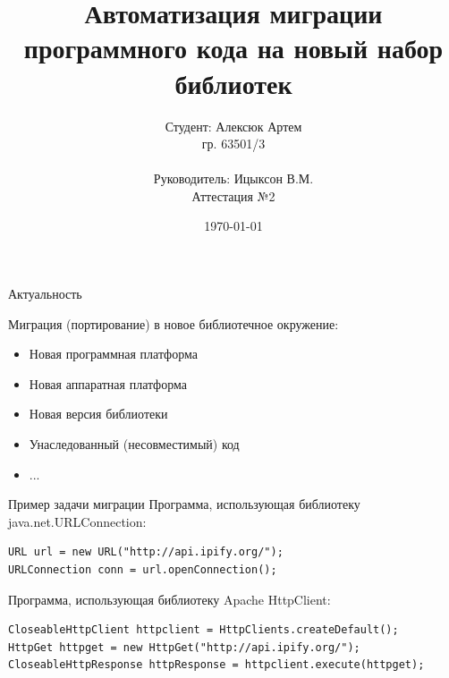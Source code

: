 \documentclass[12pt]{beamer}
\title{Автоматизация миграции программного кода на новый набор библиотек}
\date{\today}
\author[Алексюк Артем]{
    Студент: Алексюк Артем\\
    гр. 63501/3\\ \\
    Руководитель: Ицыксон В.М.\\
    Аттестация №2
}
\begin{document}
\maketitle




{
\begin{frame}{Актуальность}
\begin{mybox}[]
Миграция (портирование) в новое библиотечное окружение:
\begin{itemize}
	\item Новая программная платформа
	\item Новая аппаратная платформа
	\item Новая версия библиотеки
	\item Унаследованный (несовместимый) код 
	\item ...		
\end{itemize}
\end{mybox}
\end{frame}
}

\begin{frame}[fragile]{Пример задачи миграции}
	Программа, использующая библиотеку java.net.URLConnection:
\begin{verbatim}
URL url = new URL("http://api.ipify.org/");
URLConnection conn = url.openConnection();
\end{verbatim}
	Программа, использующая библиотеку Apache HttpClient:
\begin{verbatim}
CloseableHttpClient httpclient = HttpClients.createDefault();
HttpGet httpget = new HttpGet("http://api.ipify.org/");
CloseableHttpResponse httpResponse = httpclient.execute(httpget);
\end{verbatim}
\end{frame}
\end{document}
